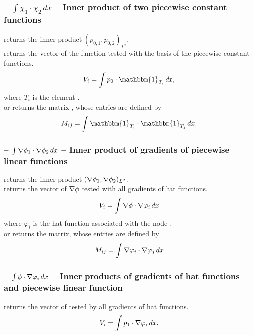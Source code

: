 \documentclass[twoside,11pt,a4paper]{article} %
\begin{document}
\subsubsection*{\texorpdfstring{ -- $\int \chi_1 \cdot \chi_2 \,dx$ --}{} Inner product of two piecewise constant functions}
 returns the inner product $(p_{0,1}, p_{0,2})_{L^2}$. \\
 returns the vector  of the function  tested with the basis of the piecewise constant functions.
\begin{align*}
 V_i = \int p_0 \cdot \mathbbm{1}_{T_i} \,dx,
\end{align*}
where $T_i$ is the element . \\
 or  returns the matrix , whose entries are defined by \begin{align*}
 M_{ij} = \int \mathbbm{1}_{T_i} \cdot \mathbbm{1}_{T_j} \,dx.
\end{align*}
\subsubsection*{\texorpdfstring{ -- $\int \nabla \phi_1 \cdot \nabla \phi_2 \,dx$ --}{} Inner product of gradients of piecewise linear functions}
 returns the inner product $(\nabla \phi_1, \nabla \phi_2)_{L^2}$. \\
 returns the vector  of $\nabla \phi$ tested with all gradients of hat functions.
\begin{align*}
 V_i = \int\nabla \phi \cdot \nabla \varphi_i \,dx
\end{align*}
where $\varphi_i$ is the hat function associated with the node . \\
 or  returns the matrix, whose entries are defined by
\begin{align*}
 M_{ij} = \int \nabla \varphi_i \cdot \nabla \varphi_j \,dx
\end{align*}

\subsubsection*{\texorpdfstring{ -- $\int  \phi \cdot \nabla \varphi_i \,dx$ --}{} Inner products of gradients of hat functions and piecewise linear function}
 returns the vector of  tested by all gradients of hat functions.
\begin{align*}
 V_i = \int p_1 \cdot \nabla \varphi_i \,dx.
\end{align*}
\end{document}
